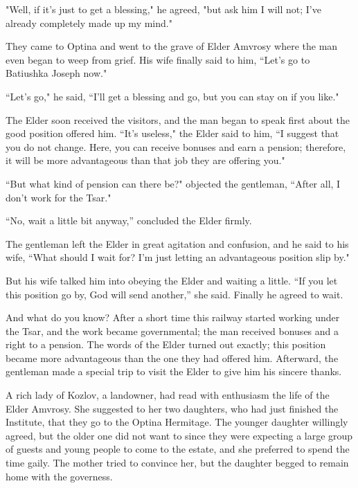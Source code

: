 "Well, if it's just to get a blessing," he agreed, "but ask him I will not; I've already completely made up my mind."

They came to Optina and went to the grave of Elder Amvrosy where the man even began to weep from grief. His wife finally said to him, “Let's go to Batiushka Joseph now."

“Let's go," he said, “I'll get a blessing and go, but you can stay on if you like."

The Elder soon received the visitors, and the man began to speak first about the good position offered him. “It's useless," the Elder said to him, “I suggest that you do not change. Here, you can receive bonuses and earn a pension; therefore, it will be more advantageous than that job they are offering you."

“But what kind of pension can there be?" objected the gentleman, “After all, I don't work for the Tsar."

“No, wait a little bit anyway,” concluded the Elder firmly.

The gentleman left the Elder in great agitation and confusion, and he said to his wife, “What should I wait for? I'm just letting an advantageous position slip by."

But his wife talked him into obeying the Elder and waiting a little. “If you let this position go by, God will send another,” she said. Finally he agreed to wait.

And what do you know? After a short time this railway started working under the Tsar, and the work became governmental; the man received bonuses and a right to a pension. The words of the Elder turned out exactly; this position became more advantageous than the one they had offered him. Afterward, the gentleman made a special trip to visit the Elder to give him his sincere thanks.

A rich lady of Kozlov, a landowner, had read with enthusiasm the life of the Elder Amvrosy. She suggested to her two daughters, who had just finished the Institute, that they go to the Optina Hermitage. The younger daughter willingly agreed, but the older one did not want to since they were expecting a large group of guests and young people to come to the estate, and she preferred to spend the time gaily. The mother tried to convince her, but the daughter begged to remain home with the governess.

